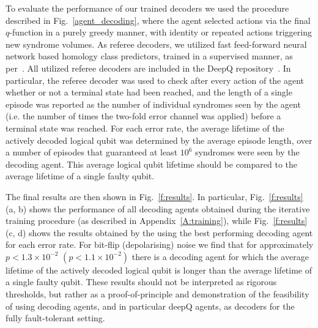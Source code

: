 \documentclass[twocolumn,preprintnumbers,amsmath,amssymb,notitlepage,nofootinbib,longbibliography,superscriptaddress,aps,pra,10pt]{revtex4-1}
\begin{document}
	To evaluate the performance of our trained decoders we used the procedure described in Fig.~\ref{agent_decoding}, where the agent selected actions via the final $q$-function in a purely greedy manner, with identity or repeated actions triggering new syndrome volumes.
	As referee decoders, we utilized fast feed-forward neural network based homology class predictors, trained in a supervised manner, as per~\cite{Torlai10, Varsamopoulos17}.
	All utilized referee decoders are included in the DeepQ repository~\cite{DeepQDecoding}.
	In particular, the referee decoder was used to check after every action of the agent whether or not a terminal state had been reached, and the length of a single episode was reported as the number of individual syndromes seen by the agent (i.e. the number of times the two-fold error channel was applied) before a terminal state was reached.
	For each error rate, the average lifetime of the actively decoded logical qubit was determined by the average episode length, over a number of episodes that guaranteed at least $10^6$ syndromes were seen by the decoding agent.
	This average logical qubit lifetime should be compared to the average lifetime of a single faulty qubit.

	The final results are then shown in Fig.~\ref{f:results}.
	In particular, Fig.~\ref{f:results} (a, b) shows the performance of all decoding agents obtained during the iterative training procedure (as described in Appendix~\ref{A:training}), while Fig.~\ref{f:results} (c, d) shows the results obtained by the using the best performing decoding agent for each error rate.
	For bit-flip (depolarising) noise we find that for approximately $p < 1.3\times 10^{-2}$  $(p < 1.1\times 10^{-2})$ there is a decoding agent for which the average lifetime of the actively decoded logical qubit is longer than the average lifetime of a single faulty qubit.
	These results should not be interpreted as rigorous thresholds, but rather as a proof-of-principle and demonstration of the feasibility of using decoding agents, and in particular deepQ agents, as decoders for the fully fault-tolerant setting.
\end{document}
